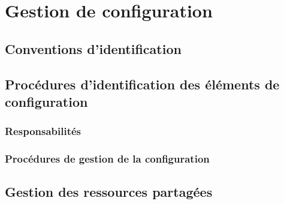\section{Gestion de configuration}

\subsection{Conventions d'identification}

\subsection{Procédures d'identification des éléments de configuration}

\subsubsection{Responsabilités}

\subsubsection{Procédures de gestion de la configuration}

\subsection{Gestion des ressources partagées}
